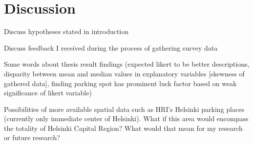 \section{Discussion}
\justify



Discuss hypotheses stated in introduction

Discuss feedback I received during the process of gathering survey data

Some words about thesis result findings (expected likert to be better descriptions, disparity between mean and median values in explanatory variables [skewness of gathered data], finding parking spot has prominent luck factor based on weak significance of likert variable)

Possibilities of more available spatial data such as HRI's Helsinki parking places (currently only immediate center of Helsinki). What if this area would encompass the totality of Helsinki Capital Region? What would that mean for my research or future research?

